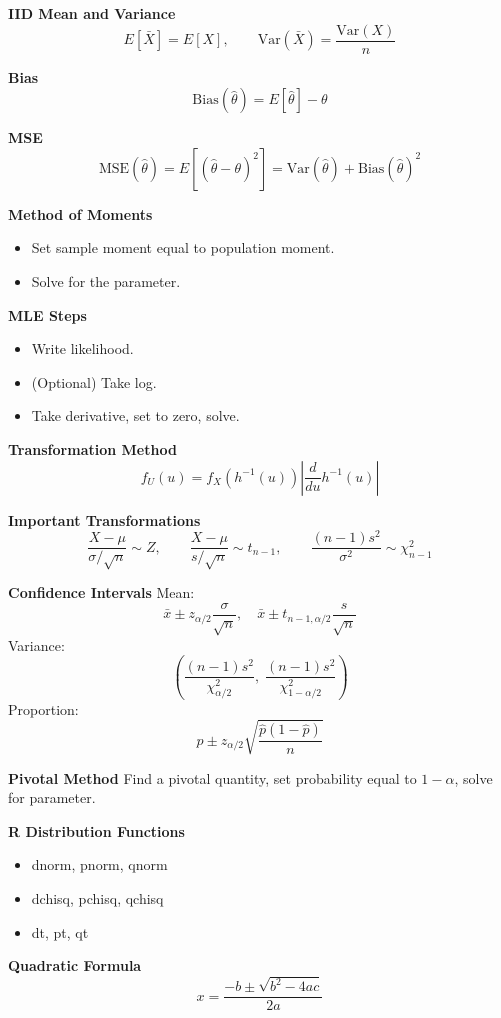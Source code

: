 \documentclass[11pt,letterpaper]{article}
\theoremstyle{remark}
\begin{document}
\textbf{IID Mean and Variance}
\[
E[\bar{X}] = E[X], \qquad \mathrm{Var}(\bar{X}) = \frac{\mathrm{Var}(X)}{n} \tag{5}
\]

\textbf{Bias}
\[
\mathrm{Bias}(\hat{\theta}) = E[\hat{\theta}] - \theta \tag{6}
\]

\textbf{MSE}
\[
\mathrm{MSE}(\hat{\theta}) = E[(\hat{\theta}-\theta)^2]
= \mathrm{Var}(\hat{\theta}) + \mathrm{Bias}(\hat{\theta})^2 \tag{7}
\]

\textbf{Method of Moments}
\begin{itemize}
\item Set sample moment equal to population moment.
\item Solve for the parameter.
\end{itemize}

\textbf{MLE Steps}
\begin{itemize}
\item Write likelihood.
\item (Optional) Take log.
\item Take derivative, set to zero, solve.
\end{itemize}

\textbf{Transformation Method}
\[
f_U(u) = f_X(h^{-1}(u))\left|\frac{d}{du}h^{-1}(u)\right| \tag{8}
\]

\textbf{Important Transformations}
\[
\frac{X-\mu}{\sigma/\sqrt{n}} \sim Z, \qquad
\frac{X-\mu}{s/\sqrt{n}} \sim t_{n-1}, \qquad
\frac{(n-1)s^2}{\sigma^2} \sim \chi^2_{n-1} \tag{9}
\]

\textbf{Confidence Intervals}
Mean:
\[
\bar{x} \pm z_{\alpha/2}\frac{\sigma}{\sqrt{n}}, \quad
\bar{x} \pm t_{n-1,\alpha/2}\frac{s}{\sqrt{n}} \tag{11}
\]
Variance:
\[
\left(\frac{(n-1)s^2}{\chi^2_{\alpha/2}},\;
\frac{(n-1)s^2}{\chi^2_{1-\alpha/2}}\right) \tag{12}
\]
Proportion:
\[
\hat{p} \pm z_{\alpha/2}\sqrt{\frac{\hat{p}(1-\hat{p})}{n}} \tag{13}
\]

\textbf{Pivotal Method}
Find a pivotal quantity, set probability equal to $1-\alpha$, solve for parameter.

\textbf{R Distribution Functions}
\begin{itemize}
\item dnorm, pnorm, qnorm
\item dchisq, pchisq, qchisq
\item dt, pt, qt
\end{itemize}

\textbf{Quadratic Formula}
\[
x = \frac{-b \pm \sqrt{b^2 - 4ac}}{2a} \tag{14}
\]
\end{document}
